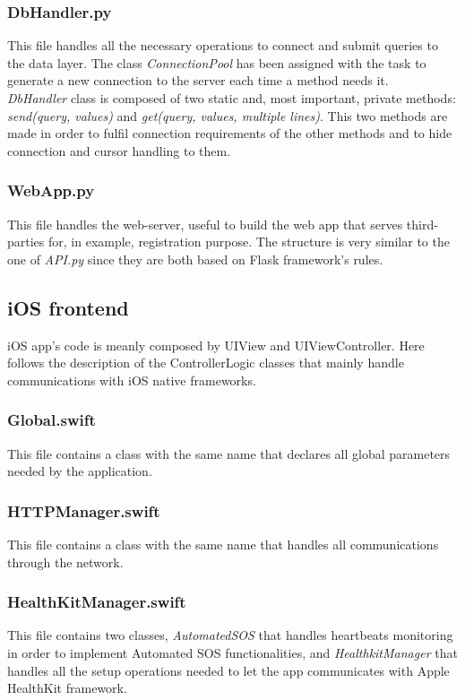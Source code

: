 \documentclass{article}
\begin{document}
 \subsubsection{DbHandler.py}
 This file handles all the necessary operations to connect and submit queries to the data layer. The class \textit{ConnectionPool} has been assigned with the task to generate a new connection to the server each time a method needs it.\\ \textit{DbHandler} class is composed of two static and, most important, private methods: \textit{send(query, values)} and \textit{get(query, values, multiple lines)}. This two methods are made in order to fulfil connection requirements of the other methods and to hide connection and cursor handling to them.
 
 \subsubsection{WebApp.py}
 This file handles the web-server, useful to build the web app that serves third-parties for, in example, registration purpose. The structure is very similar to the one of \textit{API.py} since they are both based on Flask framework's rules.
 
\subsection{iOS frontend}
iOS app's code is meanly composed by UIView and UIViewController. Here follows the description of the ControllerLogic classes that mainly handle communications with iOS native frameworks.

\subsubsection{Global.swift}
This file contains a class with the same name that declares all global parameters needed by the application.

\subsubsection{HTTPManager.swift}
This file contains a class with the same name that handles all communications through the network.

\subsubsection{HealthKitManager.swift}
This file contains two classes, \textit{AutomatedSOS} that handles heartbeats monitoring in order to implement Automated SOS functionalities, and \textit{HealthkitManager} that handles all the setup operations needed to let the app communicates with Apple HealthKit framework.
\end{document}
